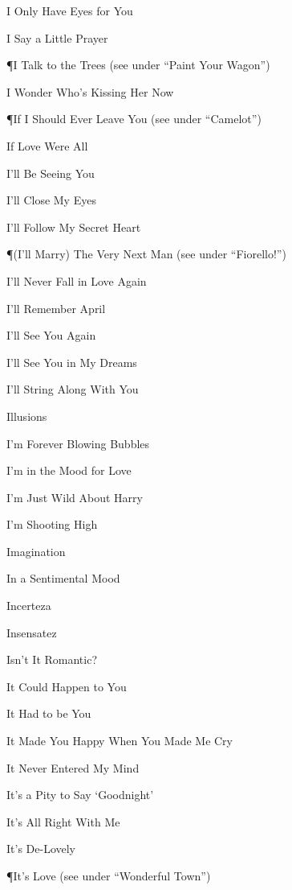 \N I Only Have Eyes for You

\N I Say a Little Prayer

\P I Talk to the Trees
\nobreak
\T (see under ``Paint Your Wagon'')

\N I Wonder Who's Kissing Her Now

\P If I Should Ever Leave You
\nobreak
\T (see under ``Camelot'')

\N If Love Were All

\N I'll Be Seeing You

\N I'll Close My Eyes

\N I'll Follow My Secret Heart

\P (I'll Marry) The Very Next Man
\nobreak
\T (see under ``Fiorello!'')

\N I'll Never Fall in Love Again

\N I'll Remember April

\N I'll See You Again

\N I'll See You in My Dreams

\N I'll String Along With You

\N Illusions

\N I'm Forever Blowing Bubbles

\N {}

\N I'm in the Mood for Love

\N I'm Just Wild About Harry

\N I'm Shooting High

\N Imagination

\N In a Sentimental Mood

\N Incerteza

\N Insensatez

\N Isn't It Romantic?

\N {}

\N It Could Happen to You

\N It Had to be You

\N It Made You Happy When You Made Me Cry

\N It Never Entered My Mind

\N It's a Pity to Say `Goodnight'

\N It's All Right With Me

\N It's De-Lovely

\P It's Love
\nobreak
\T (see under ``Wonderful Town'')

